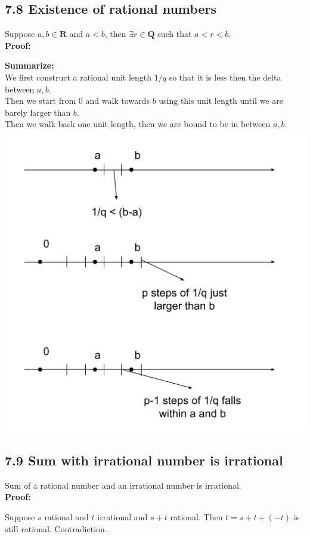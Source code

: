 \documentclass{article}
\begin{document}
\subsection*{7.8 Existence of rational numbers}
Suppose $a, b \in \mathbf{R}$ and $a < b$, then $\exists r \in \mathbf{Q}$ such that $a < r < b$.\\
\textbf{Proof:}
\begin{addmargin}[1em]{0em}
    \textbf{Summarize:\\}
    We first construct a rational unit length $1/q$ so that it is less then the delta between $a, b$.\\
    Then we start from $0$ and walk towards $b$ using this unit length until we are barely larger than $b$.\\
    Then we walk back one unit length, then we are bound to be in between $a, b$.\\
    \includegraphics[scale=0.55]{UnitLength.png}
\end{addmargin}
\subsection*{7.9 Sum with irrational number is irrational}
Sum of a rational number and an irrational number is irrational.\\
\textbf{Proof:}
\begin{addmargin}[1em]{0em}
    Suppose $s$ rational and $t$ irrational and $s+t$ rational. Then $t = s+t + (-t)$ is still rational. Contradiction.
\end{addmargin}
\end{document}
